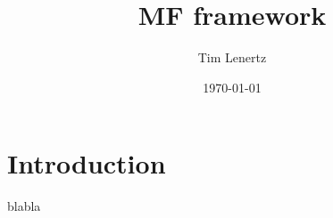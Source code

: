 \documentclass[10pt]{scrartcl}
\begin{document}
\title{MF framework}
\author{Tim Lenertz}
\date{\today}

\maketitle

\section{Introduction}
blabla
\end{document}
